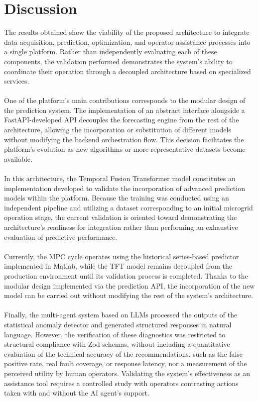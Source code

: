 \documentclass[journal,article,submit,pdftex,moreauthors]{Definitions/mdpi}
\begin{document}
\section{Discussion}
The results obtained show the viability of the proposed architecture to integrate data acquisition, prediction, optimization, and operator assistance processes into a single platform. Rather than independently evaluating each of these components, the validation performed demonstrates the system's ability to coordinate their operation through a decoupled architecture based on specialized services.
\\
\\
One of the platform's main contributions corresponds to the modular design of the prediction system. The implementation of an abstract interface alongside a FastAPI-developed API decouples the forecasting engine from the rest of the architecture, allowing the incorporation or substitution of different models without modifying the backend orchestration flow. This decision facilitates the platform's evolution as new algorithms or more representative datasets become available.
\\
\\
In this architecture, the Temporal Fusion Transformer model constitutes an implementation developed to validate the incorporation of advanced prediction models within the platform. Because the training was conducted using an independent pipeline and utilizing a dataset corresponding to an initial microgrid operation stage, the current validation is oriented toward demonstrating the architecture's readiness for integration rather than performing an exhaustive evaluation of predictive performance.
\\
\\
Currently, the MPC cycle operates using the historical series-based predictor implemented in Matlab, while the TFT model remains decoupled from the production environment until its validation process is completed. Thanks to the modular design implemented via the prediction API, the incorporation of the new model can be carried out without modifying the rest of the system's architecture.
\\
\\
Finally, the multi-agent system based on LLMs processed the outputs of the statistical anomaly detector and generated structured responses in natural language. However, the verification of these diagnostics was restricted to structural compliance with Zod schemas, without including a quantitative evaluation of the technical accuracy of the recommendations, such as the false-positive rate, real fault coverage, or response latency, nor a measurement of the perceived utility by human operators. Validating the system's effectiveness as an assistance tool requires a controlled study with operators contrasting actions taken with and without the AI agent's support.  
\\
\end{document}
